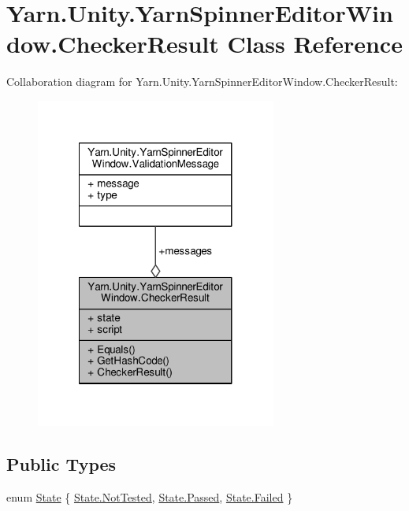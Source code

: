 \hypertarget{a00029}{\section{Yarn.\-Unity.\-Yarn\-Spinner\-Editor\-Window.\-Checker\-Result Class Reference}
\label{a00029}
}


Collaboration diagram for Yarn.\-Unity.\-Yarn\-Spinner\-Editor\-Window.\-Checker\-Result\-:
\nopagebreak
\begin{figure}[H]
\begin{center}
\leavevmode
\includegraphics[width=224pt]{d7/d7e/a00709}
\end{center}
\end{figure}
\subsection*{Public Types}
\begin{DoxyCompactItemize}
\item 
enum \hyperlink{a00029_ab24848d7951ce44eb3c7768c6ee10385}{State} \{ \hyperlink{a00029_ab24848d7951ce44eb3c7768c6ee10385a0197c47523ba5a2bdfef705786687de5}{State.\-Not\-Tested}, 
\hyperlink{a00029_ab24848d7951ce44eb3c7768c6ee10385aa0d0628f6b4e4d78d2ffef4d4d1c4b15}{State.\-Passed}, 
\hyperlink{a00029_ab24848d7951ce44eb3c7768c6ee10385ad7c8c85bf79bbe1b7188497c32c3b0ca}{State.\-Failed}
 \}
\end{DoxyCompactItemize}
